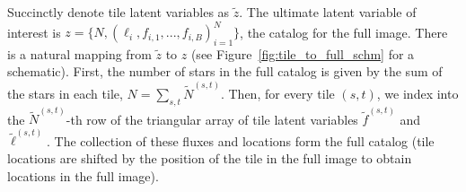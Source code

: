Succinctly denote tile latent variables as $\tilde z$.
The ultimate latent variable of interest is $z = \{N, (\ell_i, f_{i,1}, ..., f_{i,B})_{i = 1}^N\}$, the catalog for the full image.
There is a natural mapping from $\tilde z$ to $z$
(see Figure~\ref{fig:tile_to_full_schm} for a schematic). 
First, the number of stars in the full catalog is given by the sum of the stars in each tile, $N = \sum_{s,t} \tilde N^{(s, t)}$. 
Then, for every tile $(s,t)$, we index into the $\tilde N^{(s,t)}$-th row of the triangular array of tile latent variables $\tilde f^{(s,t)}$ and $\tilde \ell^{(s,t)}$. 
The collection of these fluxes and locations form the full catalog (tile locations are shifted by the position of the tile in the full image to obtain locations in the full image). 





